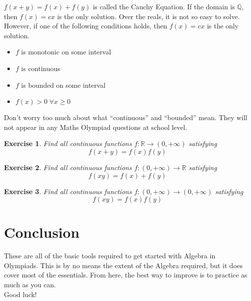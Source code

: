 \documentclass[a4paper,12pt]{article}
\newtheorem{exercise}{Exercise}[section]
\begin{document}
$f(x + y) = f(x) + f(y)$ is called the Cauchy Equation. If the domain is $\mathbb{Q}$, then $f(x) = cx$ is the only solution. Over the reals, it is not so easy to solve. However, if one of the following conditions holds, then $f(x) = cx$ is the only solution.
\begin{itemize}
    \item $f$ is monotonic on some interval
    \item $f$ is continuous
    \item $f$ is bounded on some interval
    \item $f(x) > 0 \; \forall x \ge 0$
\end{itemize}

Don't worry too much about what ``continuous'' and ``bounded'' mean. They will not appear in any Maths Olympiad questions at school level.

\begin{exercise}
    Find all continuous functions $f: \mathbb{R} \rightarrow (0, +\infty)$ satisfying
    $$f(x + y) = f(x)f(y)$$
\end{exercise}
\begin{exercise}
    Find all continuous functions $f: (0, +\infty) \rightarrow \mathbb{R}$ satisfying
    $$f(xy) = f(x) + f(y)$$
\end{exercise}
\begin{exercise}
    Find all continuous functions $f: (0, +\infty) \rightarrow (0, +\infty)$ satisfying
    $$f(xy) = f(x)f(y)$$
\end{exercise}

\clearpage
\section{Conclusion}
These are all of the basic tools required to get started with Algebra in Olympiads. This is by no means the extent of the Algebra required, but it does cover most of the essentials. From here, the best way to improve is to practice as much as you can.\\ Good luck!
\end{document}
